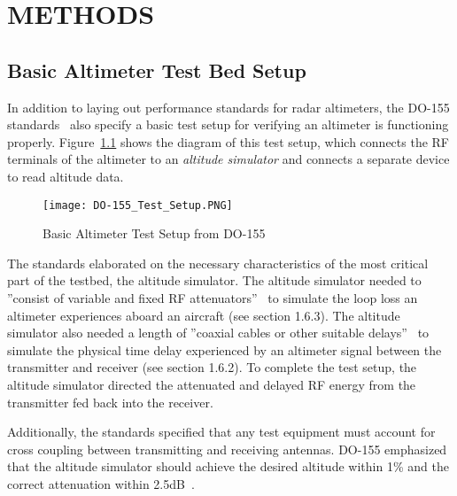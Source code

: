 %
%
%
%



\chapter{METHODS} 
\section{Basic Altimeter Test Bed Setup} \label{sec:Basic}
In addition to laying out performance standards for radar altimeters, the DO-155 standards~\cite{noauthor_minimum_1974} also specify a basic test setup for verifying an altimeter is functioning properly. Figure~\ref{fig:Basic Testbed} shows the diagram of this test setup, which connects the RF terminals of the altimeter to an \textit{altitude simulator} and connects a separate device to read altitude data.  
\begin{figure}[ht]
\centering
\texttt{[image: DO-155\_Test\_Setup.PNG]}
\caption{Basic Altimeter Test Setup from DO-155~\cite{noauthor_minimum_1974}}

\label{fig:Basic Testbed}

\end{figure}

The standards elaborated on the necessary characteristics of the most critical part of the testbed, the altitude simulator. The altitude simulator needed to ''consist of variable and fixed RF attenuators''~\cite{noauthor_minimum_1974}  to simulate the loop loss an altimeter experiences aboard an aircraft (see section 1.6.3). The altitude simulator also needed a length of ''coaxial cables or other suitable delays''~\cite{noauthor_minimum_1974}  to simulate the physical time delay experienced by an altimeter signal between the transmitter and receiver (see section 1.6.2). To complete the test setup, the altitude simulator directed the attenuated and delayed RF energy from the transmitter fed back into the receiver. 


Additionally, the standards specified that any test equipment must account for cross coupling between transmitting and receiving antennas. DO-155 emphasized that the altitude simulator should achieve the desired altitude within 1\% and the correct attenuation within 2.5dB~\cite{noauthor_minimum_1974}.


